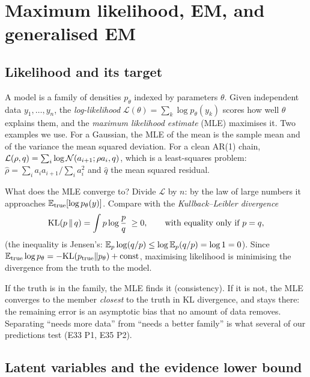 \section{Maximum likelihood, EM, and generalised EM}\label{sec:em}

\subsection{Likelihood and its target}

A model is a family of densities $p_\theta$ indexed by parameters $\theta$. Given independent data $y_1,\dots,y_n$,
the \emph{log-likelihood} $\mathcal L(\theta)=\sum_k\log p_\theta(y_k)$ scores how well $\theta$ explains them, and
the \emph{maximum likelihood estimate} (MLE) maximises it. Two examples we use.
For a Gaussian, the MLE of the mean is the sample mean and of the variance the mean squared deviation. For
a clean AR(1) chain, $\mathcal L(\rho,q)=\sum_i\log\mathcal{N}(a_{i+1};\rho a_i,q)$, which is a least-squares problem:
$\hat\rho=\sum_ia_ia_{i+1}/\sum_ia_i^2$ and $\hat q$ the mean squared residual.

What does the MLE converge to? Divide $\mathcal L$ by $n$: by the law of large numbers it approaches
$\mathbb{E}_{\rm true}[\log p_\theta(y)]$. Compare with the \emph{Kullback--Leibler divergence}
\[
  \mathrm{KL}(p\,\|\,q)=\int p\log\frac pq\;\ge0,\qquad\text{with equality only if }p=q,
\]
(the inequality is Jensen's: $\mathbb{E}_p\log(q/p)\le\log\mathbb{E}_p(q/p)=\log1=0$). Since
$\mathbb{E}_{\rm true}\log p_\theta=-\mathrm{KL}(p_{\rm true}\|p_\theta)+\text{const}$, maximising likelihood is minimising the
divergence from the truth to the model.

\begin{keyidea}
If the truth is in the family, the MLE finds it (consistency). If it is not, the MLE converges to the member
\emph{closest} to the truth in KL divergence, and stays there: the remaining error is an asymptotic bias that
no amount of data removes. Separating ``needs more data'' from ``needs a better family'' is what several of our
predictions test (E33 P1, E35 P2).
\end{keyidea}

\subsection{Latent variables and the evidence lower bound}

